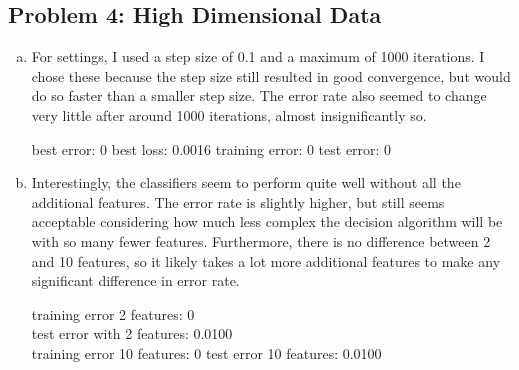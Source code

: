 \documentclass[twoside,11pt]{article}
\theoremstyle{definition}
\begin{document}

\subsection*{Problem 4: High Dimensional Data}

\begin{enumerate}[(a)]
\item For settings, I used a step size of 0.1 and a maximum of 1000 iterations.
I chose these because the step size still resulted in good convergence, but would do so faster than a smaller step size.
The error rate also seemed to change very little after around 1000 iterations, almost insignificantly so.

best error: 0
best loss: 0.0016
training error: 0
test error: 0

\item Interestingly, the classifiers seem to perform quite well without all the additional features.
The error rate is slightly higher, but still seems acceptable considering how much less complex the decision algorithm will be with so many fewer features.
Furthermore, there is no difference between 2 and 10 features, so it likely takes a lot more additional features to make any significant difference in error rate.

training error 2 features: 0 \\
test error with 2 features: 0.0100 \\
training error 10 features: 0
test error 10 features: 0.0100
\end{enumerate}
\end{document}
